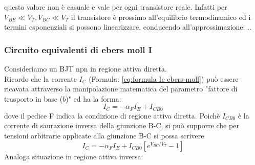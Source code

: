 \begin{citbox}
    questo valore non è casuale e vale per ogni transistore reale. Infatti per $V_{BE}\ll V_T, V_{BC}\ll V_T$ il transistore è prossimo all'equilibrio termodinamico ed i termini esponenziali si possono linearizzare, conducendo all'approssimazione:
..
\end{citbox}
\subsubsection{Circuito equivalenti di ebers moll I}
Consideriamo un BJT npn in regione attiva diretta.\\
Ricordo che la corrente $I_C$ (Formula: \ref{eq:formula Ic ebers-moll}) può essere ricavata attraverso la manipolazione matematica del parametro "fattore di trasporto in base ($b$)" ed ha la forma:
\begin{equation}
    I_C=-\alpha_F I_E +I_{CB0}
\end{equation}
dove il pedice F indica la condizione di regione attiva diretta.
Poichè $I_{CB0}$ è la corrente di saurazione inversa della giunzione B-C, si può supporre che per tensioni arbitrarie applicate alla giunzione B-C si possa scrivere
\begin{equation}
    I_C = -\alpha_F I_E +I_{CB0}\left[ e^{V_{BC}/V_T} -1 \right]
\end{equation}
Analoga situazione in regione attiva inversa:

